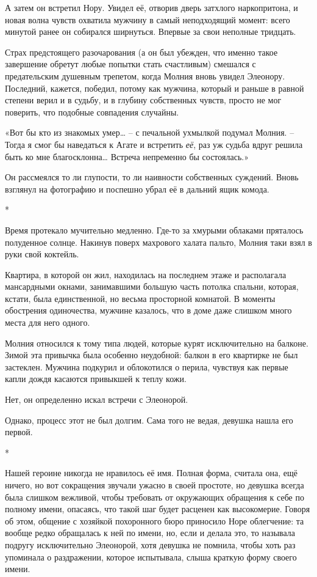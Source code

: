 \documentclass[
  a5paperpaper,
  DIV=11,
  numbers=noendperiod]{scrreprt}
\begin{document}
А затем он встретил Нору. Увидел её, отворив дверь затхлого
наркопритона, и новая волна чувств охватила мужчину в самый неподходящий
момент: всего минутой ранее он собирался ширнуться. Впервые за свои
неполные тридцать.

Страх предстоящего разочарования (а он был убежден, что именно такое
завершение обретут любые попытки стать счастливым) смешался с
предательским душевным трепетом, когда Молния вновь увидел Элеонору.
Последний, кажется, победил, потому как мужчина, который и раньше в
равной степени верил и в судьбу, и в глубину собственных чувств, просто
не мог поверить, что подобные совпадения случайны.

«Вот бы кто из знакомых умер\ldots{} -- с печальной ухмылкой подумал
Молния. -- Тогда я смог бы наведаться к Агате и встретить \emph{её}, раз
уж судьба вдруг решила быть ко мне благосклонна\ldots{} Встреча
непременно бы состоялась.»

Он рассмеялся то ли глупости, то ли наивности собственных суждений.
Вновь взглянул на фотографию и поспешно убрал её в дальний ящик комода.

*

Время протекало мучительно медленно. Где-то за хмурыми облаками
пряталось полуденное солнце. Накинув поверх махрового халата пальто,
Молния таки взял в руки свой коктейль.

Квартира, в которой он жил, находилась на последнем этаже и располагала
мансардными окнами, занимавшими большую часть потолка спальни, которая,
кстати, была единственной, но весьма просторной комнатой. В моменты
обострения одиночества, мужчине казалось, что в доме даже слишком много
места для него одного.

Молния относился к тому типа людей, которые курят исключительно на
балконе. Зимой эта привычка была особенно неудобной: балкон в его
квартирке не был застеклен. Мужчина подкурил и облокотился о перила,
чувствуя как первые капли дождя касаются привыкшей к теплу кожи.

Нет, он определенно искал встречи с Элеонорой.

Однако, процесс этот не был долгим. Сама того не ведая, девушка нашла
его первой.

*

Нашей героине никогда не нравилось её имя. Полная форма, считала она,
ещё ничего, но вот сокращения звучали ужасно в своей простоте, но
девушка всегда была слишком вежливой, чтобы требовать от окружающих
обращения к себе по полному имени, опасаясь, что такой шаг будет
расценен как высокомерие. Говоря об этом, общение с хозяйкой похоронного
бюро приносило Норе облегчение: та вообще редко обращалась к ней по
имени, но, если и делала это, то называла подругу исключительно
Элеонорой, хотя девушка не помнила, чтобы хоть раз упоминала о
раздражении, которое испытывала, слыша краткую форму своего имени.
\end{document}
